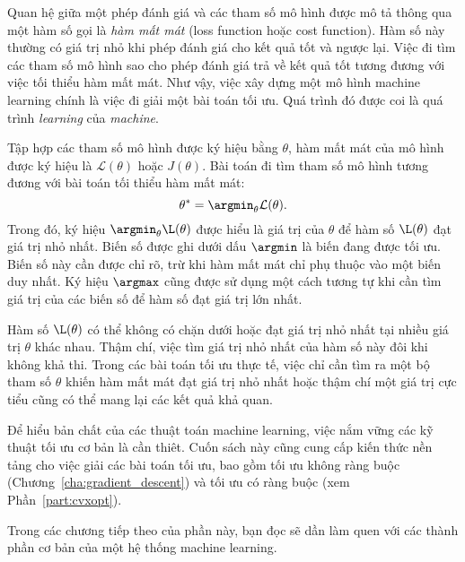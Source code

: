 Quan hệ giữa một phép đánh giá và các tham số mô hình được mô tả thông qua một
hàm số gọi là \textit{hàm mất mát} ({loss function} hoặc
{cost function}). Hàm số này thường có giá trị nhỏ khi
phép đánh giá cho kết quả tốt và ngược lại. Việc đi tìm các tham số mô hình sao
cho phép đánh giá trả về kết quả tốt tương đương với việc tối thiểu hàm mất mát.
Như vậy, việc xây dựng một mô hình machine learning chính là việc đi giải một
bài toán tối ưu. Quá trình đó được coi là quá trình \textit{learning} của
\textit{machine}.

Tập hợp các tham số mô hình được ký hiệu bằng $\theta$, hàm mất mát của
mô hình được ký hiệu là $\mathcal{L}(\theta)$ hoặc $J(\theta)$. Bài toán đi tìm tham số mô hình tương đương với bài toán tối thiểu hàm mất mát:
\begin{equation}
    \theta^* = \argmin_{\theta}\mathcal{L}(\theta).
\end{equation}
Trong đó, ký hiệu $\displaystyle \argmin_{\theta}\L(\theta)$ được hiểu là giá
trị của $\theta$ để hàm số $\L(\theta)$ đạt giá trị nhỏ nhất. Biến số được ghi
dưới dấu $\argmin$ là biến đang được tối ưu. Biến số này cần được chỉ rõ, trừ
khi hàm mất mát chỉ phụ thuộc vào một biến duy nhất. Ký hiệu $\argmax$ cũng được
sử dụng một cách tương tự khi cần tìm giá trị của các biến số để hàm số đạt giá
trị lớn nhất.

Hàm số $\L(\theta)$ có thể không có chặn dưới hoặc đạt giá trị nhỏ nhất tại
nhiều giá trị $\theta$ khác nhau. Thậm chí, việc tìm giá trị nhỏ nhất của hàm số
này đôi khi không khả thi. Trong các bài toán tối ưu thực tế, việc chỉ cần tìm
ra một bộ tham số $\theta$ khiến hàm mất mát đạt giá trị nhỏ nhất hoặc thậm chí
một giá trị cực tiểu cũng có thể mang lại các kết quả khả quan.

Để hiểu bản chất của các thuật toán machine learning, việc nắm vững các kỹ
thuật tối ưu cơ bản là cần thiêt. Cuốn sách này cũng cung cấp kiến thức nền tảng cho việc giải các bài toán tối ưu, bao gồm tối ưu không ràng buộc
(Chương~\ref{cha:gradient_descent}) và tối ưu có ràng buộc (xem
Phần~\ref{part:cvxopt}). 

Trong các chương tiếp theo của phần này, bạn đọc sẽ dần làm quen với các
thành phần cơ bản của một hệ thống machine learning. 


